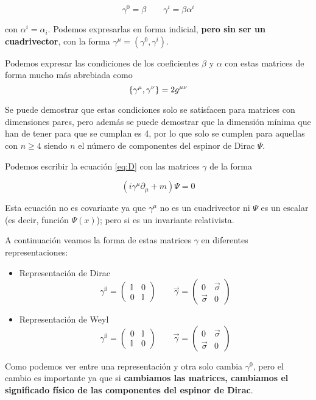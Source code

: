 \[\gamma^{0}=\beta\qquad\gamma^{i}=\beta\alpha^{i}\]

con $\alpha^{i}=\alpha_{i}$. Podemos expresarlas en forma indicial, \textbf{pero sin ser un cuadrivector}, con la forma $\gamma^\mu=(\gamma^{0},\gamma^{i})$. 

Podemos expresar las condiciones de los coeficientes $\beta$ y $\alpha$ con estas matrices de forma mucho más abrebiada como 
\[\acomm{\gamma^{\mu}}{\gamma^{\nu}}=2g^{\mu\nu}\]

Se puede demostrar que estas condiciones solo se satisfacen para matrices con dimensiones pares, pero además se puede demostrar que la dimensión mínima que han de tener para que se cumplan es 4, por lo que solo se cumplen para aquellas con $n\geq4$ siendo $n$ el número de componentes del espinor de Dirac $\Psi$. 

Podemos escribir la ecuación \ref{eq:D} con las matrices $\gamma$ de la forma 

\[(i\gamma^{\mu}\partial_{\mu}+m)\Psi=0\]

Esta ecuación no es covariante ya que $\gamma^{\mu}$ no es un cuadrivector ni $\Psi$ es un escalar (es decir, función $\Psi(x)$); pero si es un invariante relativista. 

A continuación veamos la forma de estas matrices $\gamma$  en diferentes representaciones:
\begin{itemize}
  \item Representación de Dirac
  \[\gamma^{0}=\begin{pmatrix}
      \mathbb{I} & 0 \\
      0 & \mathbb{I} 
  \end{pmatrix}\qquad \vec{\gamma}= \begin{pmatrix}
      0 & \vec{\sigma} \\
      \vec{\sigma} & 0 
  \end{pmatrix}\]
  \item Representación de Weyl
  \[\gamma^{0}=\begin{pmatrix}
      0 & \mathbb{I} \\
      \mathbb{I} & 0 
  \end{pmatrix}\qquad \vec{\gamma}= \begin{pmatrix}
      0 & \vec{\sigma} \\
      \vec{\sigma} & 0 
  \end{pmatrix}\]
\end{itemize}
Como podemos ver entre una representación y otra solo cambia $\gamma^{0}$, pero el cambio es importante ya que si \textbf{cambiamos las matrices, cambiamos el significado físico de las componentes del espinor de Dirac}.

